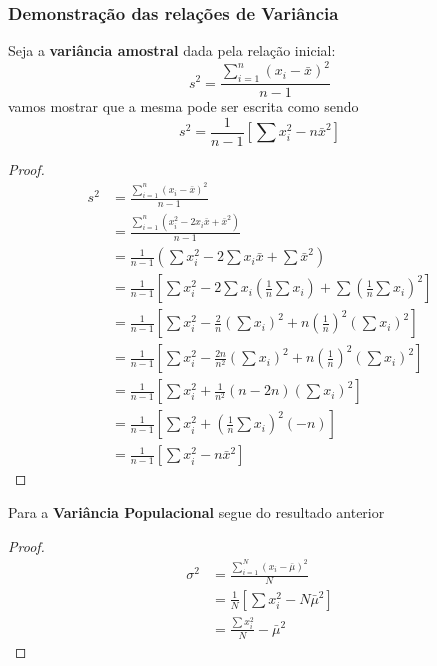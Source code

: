 \documentclass[
]{book}
\begin{document}
\hypertarget{demonstrauxe7uxe3o-das-relauxe7uxf5es-de-variuxe2ncia}{%
\subsubsection{Demonstração das relações de Variância}\label{demonstrauxe7uxe3o-das-relauxe7uxf5es-de-variuxe2ncia}}

Seja a \textbf{variância amostral} dada pela relação inicial:
\[
  s^2 = \frac{\sum_{i=1}^n (x_i - \bar{x})^2}{n-1}
  \]
vamos mostrar que a mesma pode ser escrita como sendo
\[
  s^2 = \frac{1}{n-1} \left[\sum x_i^2 - n\bar{x}^2 \right]
  \]

\begin{proof}
\begin{align*}
  s^2 & = \frac{\sum_{i=1}^n (x_i - \bar{x})^2}{n-1} \\
      & = \frac{\sum_{i=1}^n (x_i^2 -2x_i \bar{x} + \bar{x}^2)}{n-1} \\
      & = \frac{1}{n-1} \left(\sum x_i^2 - 2\sum x_i\bar{x} + \sum\bar{x}^2   \right) \\
      & = \frac{1}{n-1} \left[\sum x_i^2 - 2\sum x_i \left(\frac{1}{n} \sum x_i \right) + \sum \left(\frac{1}{n} \sum x_i \right)^2   \right] \\
      & = \frac{1}{n-1} \left[\sum x_i^2 - \frac{2}{n}\left(\sum x_i \right)^2 + n\left(\frac{1}{n}\right)^2 \left( \sum x_i \right)^2   \right]\\
      & = \frac{1}{n-1} \left[\sum x_i^2 - \frac{2n}{n^2}\left(\sum x_i \right)^2 + n\left(\frac{1}{n}\right)^2 \left( \sum x_i \right)^2   \right]\\
      & = \frac{1}{n-1} \left[\sum x_i^2 + \frac{1}{n^2}(n-2n)  \left( \sum x_i \right)^2   \right]\\
      & = \frac{1}{n-1} \left[\sum x_i^2 + \left(\frac{1}{n} \sum x_i \right)^2 (-n)  \right]\\
      & = \frac{1}{n-1} \left[\sum x_i^2 - n\bar{x}^2 \right]
  \end{align*}
\end{proof}

Para a \textbf{Variância Populacional} segue do resultado anterior

\begin{proof}
\begin{align*}
\sigma^2 &= \frac{\sum_{i=1}^N (x_i - \bar{\mu})^2}{N} \\
         &= \frac{1}{N} \left[\sum x_i^2 - N \bar{\mu}^2 \right] \\
         &= \frac{\sum x_i^2}{N} - \bar{\mu}^2
\end{align*}
\end{proof}
\end{document}

